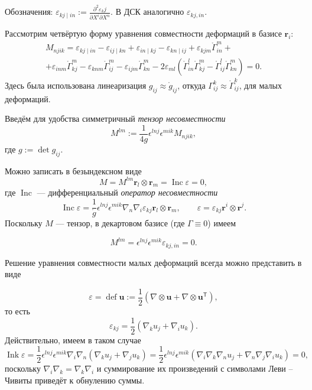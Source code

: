 {\footnotesize 
    Обозначения: $ \varepsilon_{kj\mid in} := \frac{\partial^2
    \varepsilon_kj}{\partial X^i \partial X^n} $. В ДСК аналогично $ \varepsilon_{kj, in}
    $.
}

Рассмотрим четвёртую форму уравнения совместности деформаций в базисе $
\mathbf{r}_i $: 
\begin{multline*}
    M_{njik} = \varepsilon_{kj\mid in} -
    \varepsilon_{ij\mid kn} +
    \varepsilon_{in \mid kj} -
    \varepsilon_{kn \mid ij} + 
    \varepsilon_{kjm} \mathring{\Gamma}^m_{in} + \\ +
    \varepsilon_{inm} \mathring{\Gamma}^m_{kj} -
    \varepsilon_{knm} \mathring{\Gamma}^m_{ij} -
    \varepsilon_{ijm}\mathring{\Gamma}^m_{kn} -
    2\varepsilon_{ml} (\mathring{\Gamma}^l_{in} \mathring{\Gamma}^m_{kj} -
    \mathring{\Gamma}^l_{ij} \mathring{\Gamma}^m_{kn}) = 0.
\end{multline*}
Здесь была использована линеаризация $ g_{ij} \approx \mathring{g}_{ij} $, откуда $
\Gamma^k_{ij} \approx \mathring{\Gamma}^k_{ij} $, для малых деформаций. 

Введём для удобства симметричный \emph{тензор несовместности}  
\[
    M^{lm} := \frac{1}{4g} \epsilon^{lnj} \epsilon^{mik} M_{njik},
\]
где $ g := \det g_{ij} $.

Можно записать в безындексном виде  
\[
    M = M^{lm} \mathbf{r}_l \otimes \mathbf{r}_m = \operatorname{Inc} \varepsilon = 0,
\]
где $ \operatorname{Inc} $ --- дифференциальный \emph{оператор несовместности}
\[
    \operatorname{Inc} \varepsilon = \frac{1}{\mathring{g}} \epsilon^{lnj} \epsilon^{mik}
    \nabla_n \nabla_i \varepsilon_{kj} \mathbf{r}_l \otimes \mathbf{r}_m,
    \qquad \varepsilon = \varepsilon_{kj} \mathbf{r}^i \otimes \mathbf{r}^j.
\]
Поскольку $ M $ --- тензор, в декартовом базисе (где $ \Gamma \equiv 0 $) имеем
 
\[
    M^{lm} = \epsilon^{lnj} \epsilon^{mik} \varepsilon_{kj,in} = 0.
\]

Решение уравнения совместности малых деформаций всегда можно представить в виде
 
\[
    \varepsilon = \operatorname{def} \mathbf{u} := \frac{1}{2} (\nabla \otimes
    \mathbf{u} + \nabla \otimes \mathbf{u}^{\mathsf T}),
\]
то есть
\[
    \varepsilon_{k j} = \frac{1}{2} (\nabla_k u_j + \nabla_i u_k).
\]
Действительно, имеем в таком случае  
\[
    \operatorname{Ink} \varepsilon = \frac{1}{2}
    \epsilon^{lnj}\epsilon^{mik}\nabla_i \nabla_n (\nabla_k u_j + \nabla_j u_k)
    = \frac{1}{2} \epsilon^{lnj}\epsilon^{mik} (\nabla_i\nabla_k \nabla_n u_j +
    \nabla_n \nabla_j \nabla_i u_k) = 0,
\]
поскольку $ \nabla_i \nabla_k = \nabla_k \nabla_i $ и суммирование их
произведений с символами
Леви -- Чивиты приведёт к обнулению суммы.
